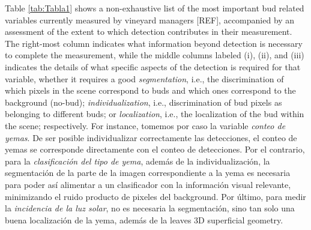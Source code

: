 \documentclass[a4paper,authoryear,review]{elsarticle}
\begin{document}
%
Table \ref{tab:Tabla1} shows a non-exhaustive list of the most important bud related variables currently measured by vineyard managers [REF], accompanied by an assessment of the extent to which detection contributes in their measurement. The right-most column indicates what information beyond detection  is necessary to complete the measurement, while the middle columns labeled (i), (ii), and (iii) indicates the details of what specific aspects of the detection is required for that variable, whether it requires a good  \emph{segmentation}, i.e., the discrimination of which pixels in the scene correspond to buds and which ones correspond to the background (no-bud); \emph{individualization}, i.e., discrimination of bud pixels as belonging to different buds; or \emph{localization}, i.e., the localization of the bud within the scene; respectively.
%
For instance, tomemos por caso la variable \emph{conteo de yemas}. De ser posible individualizar correctamente las detecciones, el conteo de yemas se corresponde directamente con el conteo de detecciones. Por el contrario, para la \emph{clasificación del tipo de yema}, además de la individualización, la segmentación de la parte de la imagen correspondiente a la yema es necesaria para poder así alimentar a un clasificador con la información visual relevante, minimizando el ruido producto de pixeles del background. Por último, para medir la \emph{incidencia de la luz solar}, no es necesaria la segmentación, sino tan solo una buena localización de la yema, además de la leaves 3D superficial geometry. 


\end{document}

